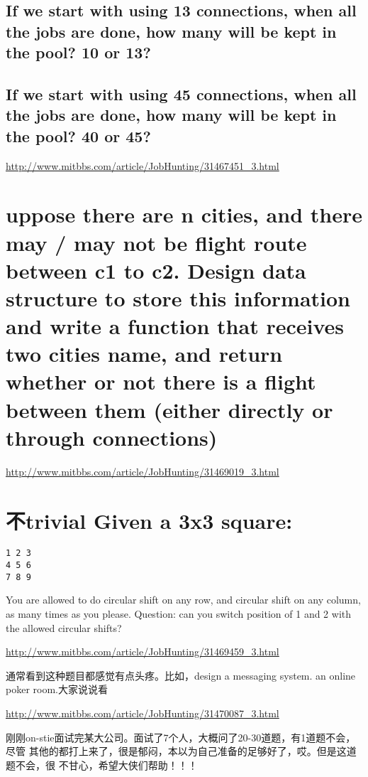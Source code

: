 \documentclass[12pt]{book}
\begin{document}
\subsection{If we start with using 13 connections, when all the jobs are done, how many will be kept in the pool? 10 or 13?}
\label{sec-13-26-1}

\subsection{If we start with using 45 connections, when all the jobs are done, how many will be kept in the pool? 40 or 45?}
\label{sec-13-26-2}

\url{http://www.mitbbs.com/article/JobHunting/31467451_3.html}

\section{uppose there are n cities, and there may / may not be flight route between c1 to c2. Design data structure to store this information and write a function that receives two cities name, and return whether or not there is a flight between them (either directly or through connections)}
\label{sec-13-27}

\url{http://www.mitbbs.com/article/JobHunting/31469019_3.html}

\section{不trivial Given a 3x3 square:}
\label{sec-13-28}
\lstset{language=java,label= ,caption= ,numbers=none}
\begin{lstlisting}
1 2 3
4 5 6
7 8 9
\end{lstlisting}
You are allowed to do circular shift on any row, and circular shift on any column, as many times as you please. Question: can you switch position of 1 and 2 with the allowed circular shifts?

\url{http://www.mitbbs.com/article/JobHunting/31469459_3.html}

通常看到这种题目都感觉有点头疼。比如，design a messaging system. an online poker room.大家说说看

\url{http://www.mitbbs.com/article/JobHunting/31470087_3.html}

刚刚on-stie面试完某大公司。面试了7个人，大概问了20-30道题，有1道题不会，尽管
其他的都打上来了，很是郁闷，本以为自己准备的足够好了，哎。但是这道题不会，很
不甘心，希望大侠们帮助！！！
\end{document}
